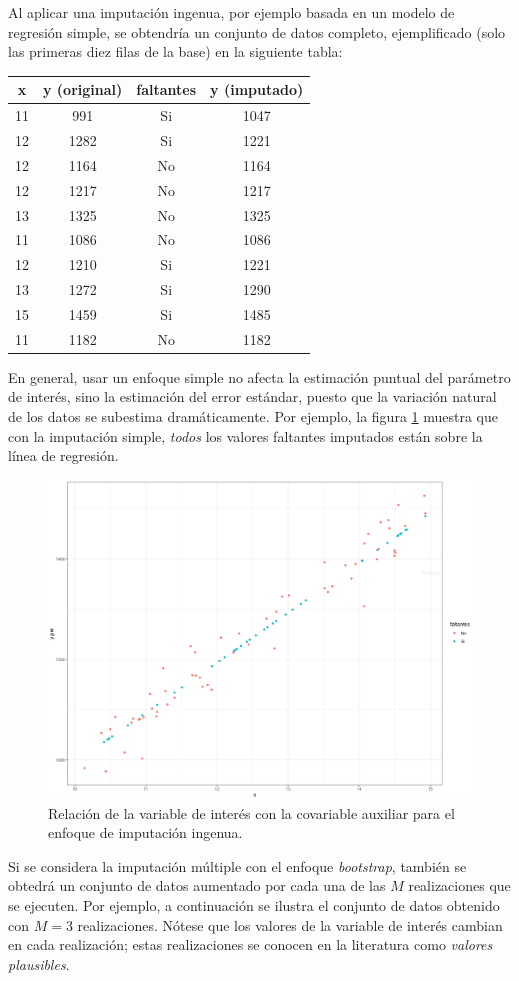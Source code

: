 \documentclass[
  12pt,
]{book}
\begin{document}
Al aplicar una imputación ingenua, por ejemplo basada en un modelo de regresión simple, se obtendría un conjunto de datos completo, ejemplificado (solo las primeras diez filas de la base) en la siguiente tabla:

\begin{longtable}[]{@{}cccc@{}}
\toprule()
x & y (original) & faltantes & y (imputado) \\
\midrule()
\endhead
11 & 991 & Si & 1047 \\
12 & 1282 & Si & 1221 \\
12 & 1164 & No & 1164 \\
12 & 1217 & No & 1217 \\
13 & 1325 & No & 1325 \\
11 & 1086 & No & 1086 \\
12 & 1210 & Si & 1221 \\
13 & 1272 & Si & 1290 \\
15 & 1459 & Si & 1485 \\
11 & 1182 & No & 1182 \\
\bottomrule()
\end{longtable}

En general, usar un enfoque simple no afecta la estimación puntual del parámetro de interés, sino la estimación del error estándar, puesto que la variación natural de los datos se subestima dramáticamente. Por ejemplo, la figura \ref{fig:figim2} muestra que con la imputación simple, \emph{todos} los valores faltantes imputados están sobre la línea de regresión.

\begin{figure}
\includegraphics[width=0.5\linewidth]{Pics/im2} \caption{Relación de la variable de interés con la covariable auxiliar para el enfoque de imputación ingenua.}\label{fig:figim2}
\end{figure}

Si se considera la imputación múltiple con el enfoque \emph{bootstrap}, también se obtedrá un conjunto de datos aumentado por cada una de las \(M\) realizaciones que se ejecuten. Por ejemplo, a continuación se ilustra el conjunto de datos obtenido con \(M=3\) realizaciones. Nótese que los valores de la variable de interés cambian en cada realización; estas realizaciones se conocen en la literatura como \emph{valores plausibles}.
\end{document}
